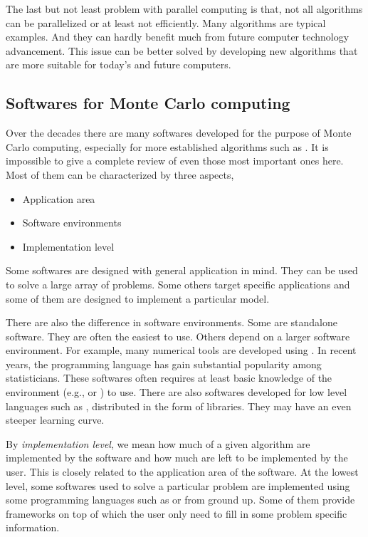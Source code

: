 The last but not least problem with parallel computing is that, not all
algorithms can be parallelized or at least not efficiently. Many \mcmc
algorithms are typical examples. And they can hardly benefit much from future
computer technology advancement. This issue can be better solved by developing
new algorithms that are more suitable for today's and future computers.

\subsection{Softwares for Monte Carlo computing}
\label{sub:Softwares for Monte Carlo computing}

Over the decades there are many softwares developed for the purpose of Monte
Carlo computing, especially for more established algorithms such as \mcmc. It
is impossible to give a complete review of even those most important ones
here. Most of them can be characterized by three aspects,
\begin{itemize}
  \item Application area
  \item Software environments
  \item Implementation level
\end{itemize}
Some softwares are designed with general application in mind. They can be used
to solve a large array of problems. Some others target specific applications
and some of them are designed to implement a particular model.

There are also the difference in software environments. Some are standalone
software. They are often the easiest to use. Others depend on a larger
software environment. For example, many numerical tools are developed using
\matlab \cite{matlab}. In recent years, the \rlang programming language
\cite{rlang} has gain substantial popularity among statisticians. These
softwares often requires at least basic knowledge of the environment (e.g.,
\matlab or \rlang) to use. There are also softwares developed for low level
languages such as \cpp, distributed in the form of libraries. They may have an
even steeper learning curve.

By \emph{implementation level}, we mean how much of a given algorithm are
implemented by the software and how much are left to be implemented by the
user. This is closely related to the application area of the software. At the
lowest level, some softwares used to solve a particular problem are
implemented using some programming languages such as \rlang or \cpp from
ground up. Some of them provide frameworks on top of which the user only need
to fill in some problem specific information.

